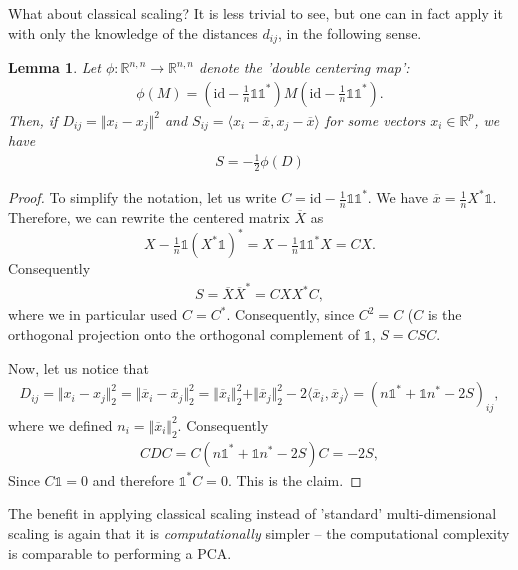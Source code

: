 \documentclass{article}
\newcommand{\id}{\mathrm{id}}
\newcommand{\sprod}[1]{\langle #1 \rangle}
\newcommand{\R}{\mathbb{R}}
\newtheorem{lemma}{Lemma}
\newcommand{\norm}[1]{\Vert #1 \Vert}
\newcommand{\one}{\mathds{1}}
\begin{document}
What about classical scaling? It is less trivial to see, but one can in fact apply it with only the knowledge of the distances $d_{ij}$, in the following sense.
\begin{lemma}
    Let $\phi:\R^{n,n}\to \R^{n,n}$ denote the 'double centering map':
    \begin{align*}
        \phi(M) = (\id-\tfrac{1}{n}\one \one^*) M(\id-\tfrac{1}{n}\mathds{1}\mathds{1}^*).
    \end{align*}
    Then, if $D_{ij}=\norm{x_i-x_j}^2$ and $S_{ij} = \sprod{x_i-\overline{x},x_j-\overline{x}}$ for some vectors $x_i\in \R^p$, we have
    \begin{align*}
        S = -\tfrac{1}{2}\phi(D)
    \end{align*}
\end{lemma}
\begin{proof}
   To simplify the notation, let us write $C=\id-\tfrac{1}{n}\one \one^*$. We have $\overline{x}= \tfrac{1}{n}X^*\one$. Therefore, we can rewrite the centered matrix $\overline{X}$ as 
   $$X-\tfrac{1}{n}  \one (X^*\one)^* = X-\tfrac{1}{n}  \one\one^* X = CX.$$
    Consequently
    \begin{align*}
        S = \overline{X}\overline{X}^* = CXX^*C,
    \end{align*}
    where we in particular used $C=C^*$. Consequently, since $C^2=C$ ($C$ is the orthogonal projection onto the orthogonal complement of $\one$, $S=CSC$.
    
    Now, let us notice that
    \begin{align*}
        D_{ij}= \norm{x_i-x_j}_2^2= \norm{\overline{x}_i-\overline{x}_j}_2^2 = \norm{\overline{x}_i}_2^2 + \norm{\overline{x}_j}_2^2 - 2\sprod{\overline{x}_i,\overline{x}_j} = (n\one^*+\one n^*-2S)_{ij},
    \end{align*}
    where we defined $n_i = \norm{\overline{x}_i}_2^2$. Consequently
    \begin{align*}
        CDC = C(n\one^*+\one n^*-2S)C = -2S,
    \end{align*}
    Since $C\one=0$ and therefore $\one^*C=0$. This is the claim.

    
   
\end{proof}
The benefit in applying classical scaling instead of 'standard'  multi-dimensional scaling is again that it is \emph{computationally} simpler -- the computational complexity is comparable to performing a PCA.
\end{document}

